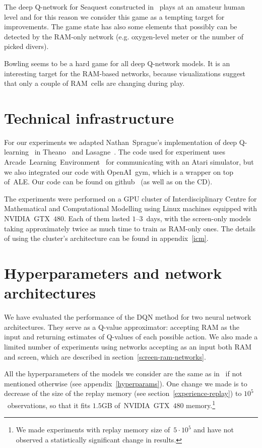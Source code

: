 The deep Q-network for Seaquest constructed in~\cite{nips-dqn} plays at an amateur human level and for this reason we consider this game as a tempting target for improvements. The game state has also some elements that possibly can be detected by the RAM-only network (e.g. oxygen-level meter or the number of picked divers).

Bowling seems to be a hard game for all deep Q-network models. It is an interesting target for the RAM-based networks, because visualizations suggest that only a couple of RAM~cells are changing during play.

\section{Technical infrastructure}\label{technical}
For our experiments we adapted Nathan~Sprague's implementation of deep Q-learning~\cite{sprague} in Theano~\cite{theano} and Lasagne~\cite{lasagne}. The code used for experiment uses Arcade~Learning~Environment~\cite{ale} for communicating with an Atari simulator, but we also integrated our code with OpenAI~gym, which is a wrapper on top of~ALE. Our code can be found on github~\cite{our-dqn} (as well as on the CD).

The experiments were performed on a GPU cluster of Interdisciplinary Centre for Mathematical and Computational Modelling using Linux machines equipped with NVIDIA~GTX~$480$. Each of them lasted $1$--$3$~days, with the screen-only models taking approximately twice as much time to train as RAM-only ones. The details of using the cluster's architecture can be found in appendix~\ref{icm}.

\section{Hyperparameters and network architectures}

We have evaluated the performance of the DQN method for two neural network architectures. They serve as a Q-value approximator: accepting RAM as the input and returning estimates of Q-values of each possible action. We also made a limited number of experiments using networks accepting as an input both RAM and screen, which are described in section~\ref{screen-ram-networks}.

All the hyperparameters of the models we consider are the same as in~\cite{nips-dqn} if not mentioned otherwise (see appendix~\ref{hyperparams}). One change we made is to decrease of the size of the replay memory (see section~\ref{experience-replay}) to $10^5$~observations, so that it fits $1.5$GB of~NVIDIA~GTX~$480$ memory.\footnote{We made experiments with replay memory size of~$5\cdot 10^5$ and have not observed a statistically significant change in results.}


